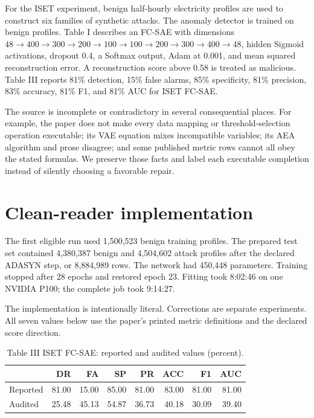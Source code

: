 \documentclass[11pt]{article}
\begin{document}
For the ISET experiment, benign half-hourly electricity profiles are used to
construct six families of synthetic attacks. The anomaly detector is trained
on benign profiles. Table I describes an FC-SAE with dimensions
\(48\!\rightarrow\!400\!\rightarrow\!300\!\rightarrow\!200\!\rightarrow\!100
\!\rightarrow\!100\!\rightarrow\!200\!\rightarrow\!300\!\rightarrow\!400
\!\rightarrow\!48\), hidden Sigmoid activations, dropout 0.4, a Softmax output,
Adam at 0.001, and mean squared reconstruction error. A reconstruction score
above 0.58 is treated as malicious. Table III reports 81\% detection, 15\%
false alarms, 85\% specificity, 81\% precision, 83\% accuracy, 81\% F1, and
81\% AUC for ISET FC-SAE.

The source is incomplete or contradictory in several consequential places.
For example, the paper does not make every data mapping or threshold-selection
operation executable; its VAE equation mixes incompatible variables; its AEA
algorithm and prose disagree; and some published metric rows cannot all obey
the stated formulas. We preserve those facts and label each executable
completion instead of silently choosing a favorable repair.

\section{Clean-reader implementation}

The first eligible run used 1,500,523 benign training profiles. The prepared
test set contained 4,380,387 benign and 4,504,602 attack profiles after the
declared ADASYN step, or 8,884,989 rows. The network had 450,448 parameters.
Training stopped after 28 epochs and restored epoch 23. Fitting took 8:02:46 on
one NVIDIA P100; the complete job took 9:14:27.

The implementation is intentionally literal. Corrections are separate
experiments. All seven values below use the paper's printed metric definitions
and the declared score direction.

\begin{table}[ht]
\centering
\caption{Table III ISET FC-SAE: reported and audited values (percent).}
\small
\begin{tabular}{lrrrrrrr}
\toprule
 & DR & FA & SP & PR & ACC & F1 & AUC \\
\midrule
Reported & 81.00 & 15.00 & 85.00 & 81.00 & 83.00 & 81.00 & 81.00 \\
Audited & 25.48 & 45.13 & 54.87 & 36.73 & 40.18 & 30.09 & 39.40 \\
\bottomrule
\end{tabular}
\end{table}
\end{document}
